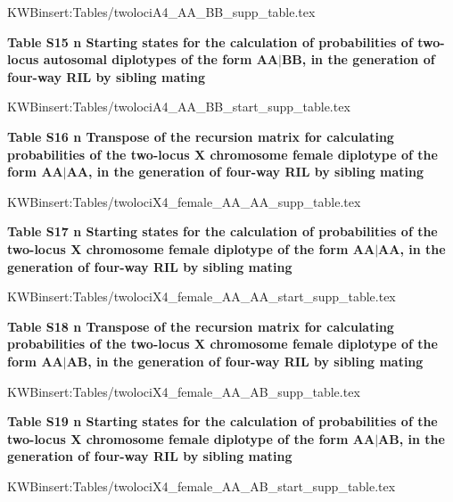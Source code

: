 \documentclass[9pt,letterpaper,twoside]{article}
\begin{document}
\bigskip

{
KWBinsert:Tables/twolociA4_AA_BB_supp_table.tex
}


\newpage

\noindent \textbf{Table S15 {\color{white} n} Starting states for the calculation of
probabilities of two-locus autosomal diplotypes of the form $\boldsymbol{AA|BB}$, 
in the generation of four-way RIL by sibling mating}

\bigskip

{
KWBinsert:Tables/twolociA4_AA_BB_start_supp_table.tex
}

\newpage

\noindent \textbf{Table S16 {\color{white} n} Transpose of the recursion matrix for
calculating probabilities of the two-locus X chromosome female diplotype of the form $\boldsymbol{AA|AA}$,
in the generation of four-way RIL by sibling mating}

\bigskip

{
KWBinsert:Tables/twolociX4_female_AA_AA_supp_table.tex
}
\newpage

\noindent \textbf{Table S17 {\color{white} n} Starting states for the calculation of
probabilities of the two-locus X chromosome female diplotype of the form $\boldsymbol{AA|AA}$, 
in the generation of four-way RIL by sibling mating}

\bigskip

{
KWBinsert:Tables/twolociX4_female_AA_AA_start_supp_table.tex
}

\newpage

\noindent \textbf{Table S18 {\color{white} n} Transpose of the recursion matrix for
calculating probabilities of the two-locus X chromosome female diplotype of the form $\boldsymbol{AA|AB}$, 
in the generation of four-way RIL by sibling mating}

\bigskip

{
KWBinsert:Tables/twolociX4_female_AA_AB_supp_table.tex
}

\newpage

\noindent \textbf{Table S19 {\color{white} n} Starting states for the calculation of
probabilities of the two-locus X chromosome female diplotype of the form $\boldsymbol{AA|AB}$,
in the generation of four-way RIL by sibling mating}

\bigskip

{
KWBinsert:Tables/twolociX4_female_AA_AB_start_supp_table.tex
}

\newpage
\end{document}
